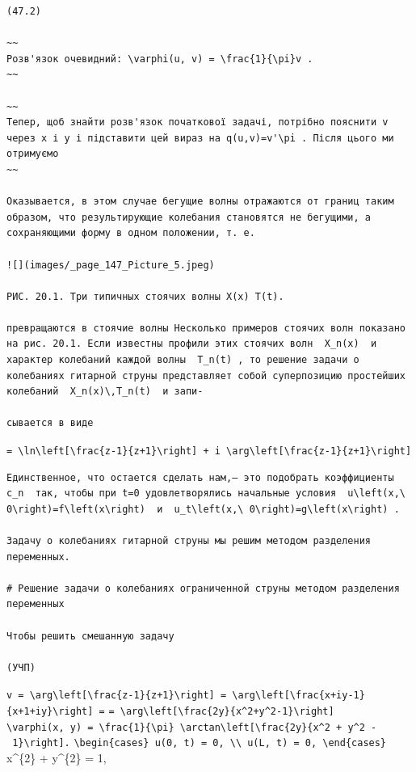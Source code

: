 \documentclass[
  ukrainian,
]{article}
\begin{document}
\begin{verbatim}
(47.2)

~~
Розв'язок очевидний: \varphi(u, v) = \frac{1}{\pi}v .
~~

~~
Тепер, щоб знайти розв'язок початкової задачі, потрібно пояснити v через x і y і підставити цей вираз на q(u,v)=v'\pi . Після цього ми отримуємо
~~

Оказывается, в этом случае бегущие волны отражаются от границ таким образом, что результирующие колебания становятся не бегущими, а сохраняющими форму в одном положении, т. е.

![](images/_page_147_Picture_5.jpeg)

РИС. 20.1. Три типичных стоячих волны X(x) T(t).

превращаются в стоячие волны Несколько примеров стоячих волн показано на рис. 20.1. Если известны профили этих стоячих волн  X_n(x)  и характер колебаний каждой волны  T_n(t) , то решение задачи о колебаниях гитарной струны представляет собой суперпозицию простейших колебаний  X_n(x)\,T_n(t)  и запи-

сывается в виде
\end{verbatim}

\texttt{=\ \textbackslash{}ln\textbackslash{}left{[}\textbackslash{}frac\{z-1\}\{z+1\}\textbackslash{}right{]}\ +\ i\ \textbackslash{}arg\textbackslash{}left{[}\textbackslash{}frac\{z-1\}\{z+1\}\textbackslash{}right{]}}

\begin{verbatim}
Единственное, что остается сделать нам,— это подобрать коэффициенты  c_n  так, чтобы при t=0 удовлетворялись начальные условия  u\left(x,\ 0\right)=f\left(x\right)  и  u_t\left(x,\ 0\right)=g\left(x\right) .

Задачу о колебаниях гитарной струны мы решим методом разделения переменных.

# Решение задачи о колебаниях ограниченной струны методом разделения переменных

Чтобы решить смешанную задачу

(УЧП)
\end{verbatim}

\texttt{v\ =\ \textbackslash{}arg\textbackslash{}left{[}\textbackslash{}frac\{z-1\}\{z+1\}\textbackslash{}right{]}\ =\ \textbackslash{}arg\textbackslash{}left{[}\textbackslash{}frac\{x+iy-1\}\{x+1+iy\}\textbackslash{}right{]}\ =}
\texttt{=\ \textbackslash{}arg\textbackslash{}left{[}\textbackslash{}frac\{2y\}\{x\^{}2+y\^{}2-1\}\textbackslash{}right{]}}
\texttt{\textbackslash{}varphi(x,\ y)\ =\ \textbackslash{}frac\{1\}\{\textbackslash{}pi\}\ \textbackslash{}arctan\textbackslash{}left{[}\textbackslash{}frac\{2y\}\{x\^{}2\ +\ y\^{}2\ -\ 1\}\textbackslash{}right{]}.}
\texttt{\textbackslash{}begin\{cases\}\ u(0,\ t)\ =\ 0,\ \textbackslash{}\textbackslash{}\ u(L,\ t)\ =\ 0,\ \textbackslash{}end\{cases\}}
x\^{}\{2\} + y\^{}\{2\} = 1,
\end{document}
